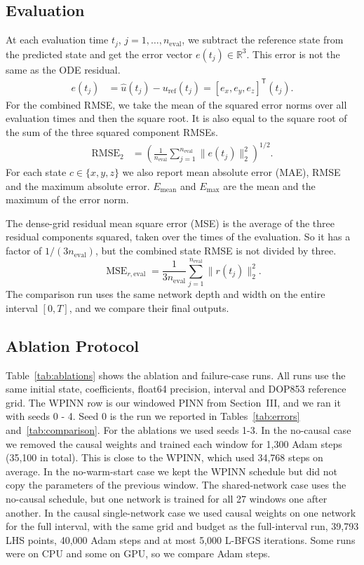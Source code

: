 \documentclass[conference,a4paper]{IEEEtran}
\begin{document}
\subsection{Evaluation}
At each evaluation time $t_j$, $j=1,\ldots,n_{\mathrm{eval}}$, we subtract the reference state from the predicted state and get the error vector $e(t_j)\in\mathbb{R}^3$. This error is not the same as the ODE residual.
\[
\begin{aligned}
e(t_j)&=\hat{u}(t_j)-u_{\mathrm{ref}}(t_j)=[e_x,e_y,e_z]^\mathsf{T}(t_j).
\end{aligned}
\]
For the combined RMSE, we take the mean of the squared error norms over all evaluation times and then the square root. It is also equal to the square root of the sum of the three squared component RMSEs.
\begin{equation}
\begin{aligned}
\operatorname{RMSE}_2
  &=\left(
      \frac{1}{n_{\mathrm{eval}}}
      \sum_{j=1}^{n_{\mathrm{eval}}}
      \|e(t_j)\|_2^2
     \right)^{1/2}.
\end{aligned}
\label{eq:rmse}
\end{equation}
For each state $c\in\{x,y,z\}$ we also report mean absolute error (MAE), RMSE and the maximum absolute error. $E_{\mathrm{mean}}$ and $E_{\mathrm{max}}$ are the mean and the maximum of the error norm.

The dense-grid residual mean square error (MSE) is the average of the three residual components squared, taken over the times of the evaluation. So it has a factor of $1/(3n_{\mathrm{eval}})$, but the combined state RMSE is not divided by three.
\[
\operatorname{MSE}_{r,\mathrm{eval}}
=\frac{1}{3n_{\mathrm{eval}}}\sum_{j=1}^{n_{\mathrm{eval}}}\|r(t_j)\|_2^2.
\]
 The comparison run uses the same network depth and width on the entire interval $[0,T]$, and we compare their final outputs.

\subsection{Ablation Protocol}
Table~\ref{tab:ablations} shows the ablation and failure-case runs. All runs use the same initial state, coefficients, float64 precision, interval and DOP853 reference grid. The WPINN row is our windowed PINN from Section~III, and we ran it with seeds 0 - 4. Seed 0 is the run we reported in Tables~\ref{tab:errors} and~\ref{tab:comparison}. For the ablations we used seeds 1-3. In the no-causal case we removed the causal weights and trained each window for 1,300 Adam steps (35,100 in total). This is close to the WPINN, which used 34,768 steps on average. In the no-warm-start case we kept the WPINN schedule but did not copy the parameters of the previous window. The shared-network case uses the no-causal schedule, but one network is trained for all 27 windows one after another. In the causal single-network case we used causal weights on one network for the full interval, with the same grid and budget as the full-interval run, 39,793 LHS points, 40,000 Adam steps and at most 5,000 L-BFGS iterations. Some runs were on CPU and some on GPU, so we compare Adam steps.
\end{document}
